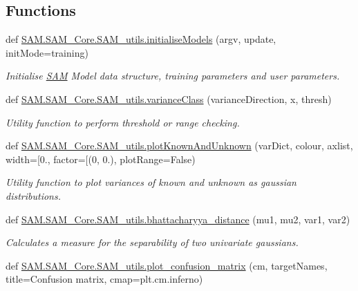 \subsection*{Functions}
\begin{DoxyCompactItemize}
\item 
def \hyperlink{group__icubclient__SAM__utils_ga7d1d61b09b614680e853bc0be5e10df1}{S\+A\+M.\+S\+A\+M\+\_\+\+Core.\+S\+A\+M\+\_\+utils.\+initialise\+Models} (argv, update, init\+Mode=\textquotesingle{}training\textquotesingle{})
\begin{DoxyCompactList}\small\item\em Initialise \hyperlink{namespaceSAM}{S\+AM} Model data structure, training parameters and user parameters. \end{DoxyCompactList}\item 
def \hyperlink{group__icubclient__SAM__utils_ga27bd9bc8ab5b70ae2f6cc18857afc88c}{S\+A\+M.\+S\+A\+M\+\_\+\+Core.\+S\+A\+M\+\_\+utils.\+variance\+Class} (variance\+Direction, x, thresh)
\begin{DoxyCompactList}\small\item\em Utility function to perform threshold or range checking. \end{DoxyCompactList}\item 
def \hyperlink{group__icubclient__SAM__utils_ga1626d58a716c5b4794ff6f6933011076}{S\+A\+M.\+S\+A\+M\+\_\+\+Core.\+S\+A\+M\+\_\+utils.\+plot\+Known\+And\+Unknown} (var\+Dict, colour, axlist, width=\mbox{[}0., factor=\mbox{[}(0, 0.), plot\+Range=False)
\begin{DoxyCompactList}\small\item\em Utility function to plot variances of known and unknown as gaussian distributions. \end{DoxyCompactList}\item 
def \hyperlink{group__icubclient__SAM__utils_gafede13612da64cc2471be35b385972ed}{S\+A\+M.\+S\+A\+M\+\_\+\+Core.\+S\+A\+M\+\_\+utils.\+bhattacharyya\+\_\+distance} (mu1, mu2, var1, var2)
\begin{DoxyCompactList}\small\item\em Calculates a measure for the separability of two univariate gaussians. \end{DoxyCompactList}\item 
def \hyperlink{group__icubclient__SAM__utils_gae515125ab69f88f48f48b3eb766927a1}{S\+A\+M.\+S\+A\+M\+\_\+\+Core.\+S\+A\+M\+\_\+utils.\+plot\+\_\+confusion\+\_\+matrix} (cm, target\+Names, title=\textquotesingle{}Confusion matrix\textquotesingle{}, cmap=plt.\+cm.\+inferno)

\end{DoxyCompactItemize}
